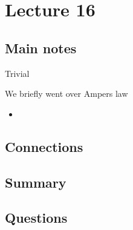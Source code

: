 \section{Lecture 16}

\subsection{Main notes}
Trivial

We briefly went over Ampers law

\begin{itemize}
	\item
\end{itemize}


\subsection{Connections}


\subsection{Summary}


\subsection{Questions}
